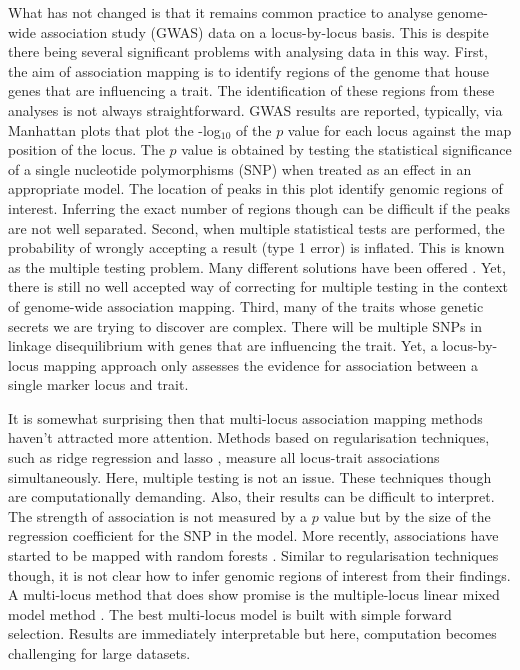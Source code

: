\documentclass{nature}
\begin{document}
What has not changed is that it remains common practice to analyse genome-wide association study (GWAS) data on a locus-by-locus basis. This is despite there being several significant problems with analysing data in this way. 
First, the aim of association mapping is to identify regions of the genome that house genes that are influencing a trait. 
The identification of these regions from these analyses is not always straightforward. GWAS results are reported, typically, via Manhattan plots 
that plot the -log$_{10}$ of the $p$ value for each locus against the map position of the locus. The $p$ value is obtained by testing the statistical 
significance of a single nucleotide polymorphisms (SNP) when treated as an effect in an appropriate model. 
The location of peaks in this plot identify genomic 
regions of interest. Inferring the exact number of regions though can be difficult if the peaks are not well separated. Second, when multiple statistical tests are performed, the probability of wrongly accepting a result (type 1 error) is inflated. This is known as the multiple testing problem. 
Many different solutions have been offered \cite{storey2003statistical, li2005adjusting, de2005efficiency}. Yet, there is still no well accepted way of correcting for multiple testing in the context of genome-wide association mapping. Third, many of the traits whose genetic secrets we are trying to discover are complex. There will be multiple SNPs in linkage disequilibrium with genes that are influencing the trait. Yet, a locus-by-locus mapping approach only assesses the evidence for association between a single marker locus and trait.

It is somewhat surprising then that multi-locus association mapping methods haven't attracted more attention. Methods based on 
regularisation techniques, such as ridge regression \cite{shen2013novel}  and lasso \cite{rakitsch2013lasso}, measure all locus-trait associations simultaneously. 
Here, multiple testing is not an issue. These techniques though are computationally demanding. Also, their results can be difficult to interpret. The strength of association is not measured by a $p$ value but by the size of the regression coefficient for the SNP in the model. More recently, associations have started to be mapped with random forests \cite{szymczak2016r2vim}. Similar to regularisation techniques though, it is not clear how to infer genomic regions of interest from their findings. A multi-locus method that does show promise is the multiple-locus linear mixed model method \cite{segura2012efficient}. The best multi-locus model is built with simple forward selection. Results are immediately interpretable but here, computation becomes challenging for large datasets. 
\end{document}
